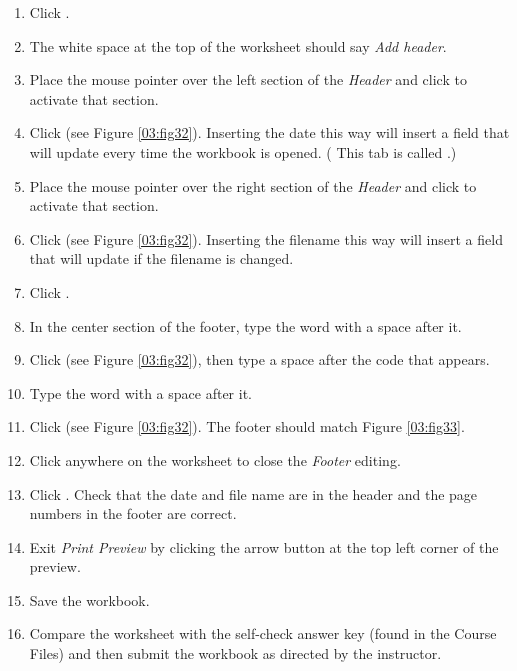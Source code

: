 \begin{enumerate}
	\item Click . 
	\item The white space at the top of the worksheet should say \textit{Add header}. 
	\item Place the mouse pointer over the left section of the \textit{Header} and click to activate that section.
	\item Click  (see Figure \ref{03:fig32}). Inserting the date this way will insert a field that will update every time the workbook is opened. ( This tab is called .)
	\item Place the mouse pointer over the right section of the \textit{Header} and click to activate that section.
	\item Click  (see Figure \ref{03:fig32}). Inserting the filename this way will insert a field that will update if the filename is changed.
	\item Click . 
	\item In the center section of the footer, type the word  with a space after it.
	\item Click  (see Figure \ref{03:fig32}), then type a space after the \fmtTyping{\&[Page]} code that appears.
	\item Type the word  with a space after it.
	\item Click  (see Figure \ref{03:fig32}). The footer should match Figure \ref{03:fig33}.
	\item Click anywhere on the worksheet to close the \textit{Footer} editing.
	\item Click . Check that the date and file name are in the header and the page numbers in the footer are correct.
	\item Exit \textit{Print Preview} by clicking the arrow button at the top left corner of the preview.
	\item Save the  workbook.
	\item Compare the worksheet with the self-check answer key (found in the Course Files) and then submit the  workbook as directed by the instructor.
\end{enumerate}

